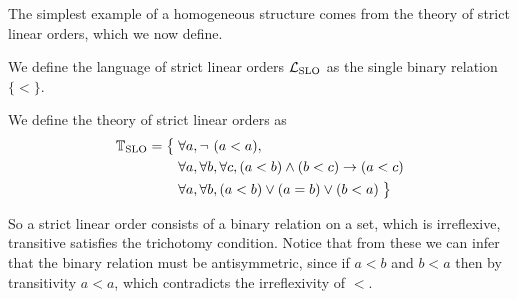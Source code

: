 The simplest example of a homogeneous structure comes from the theory of strict linear orders, which
we now define.

\begin{defn}
  We define the language of strict linear orders $\mathcal{L}_\text{SLO}$ as the single binary relation $\{ < \}$.
\end{defn}

\begin{defn}
  We define the theory of strict linear orders as
  \begin{align*}
    \mathbb{T}_\text{SLO} = \big\{\; & \forall a, \lnot\ (a < a), \\
              & \forall a, \forall b, \forall c, (a < b) \land (b < c) \rightarrow (a < c) \\
              & \forall a, \forall b, (a < b) \lor (a = b) \lor (b < a) \;\big\}
  \end{align*}
\end{defn}

So a strict linear order consists of a binary relation on a set, which is irreflexive, transitive
satisfies the trichotomy condition. Notice that from these we can infer that the binary relation
must be antisymmetric, since if $a < b$ and $b < a$ then by transitivity $a < a$, which 
contradicts the irreflexivity of $<$.

